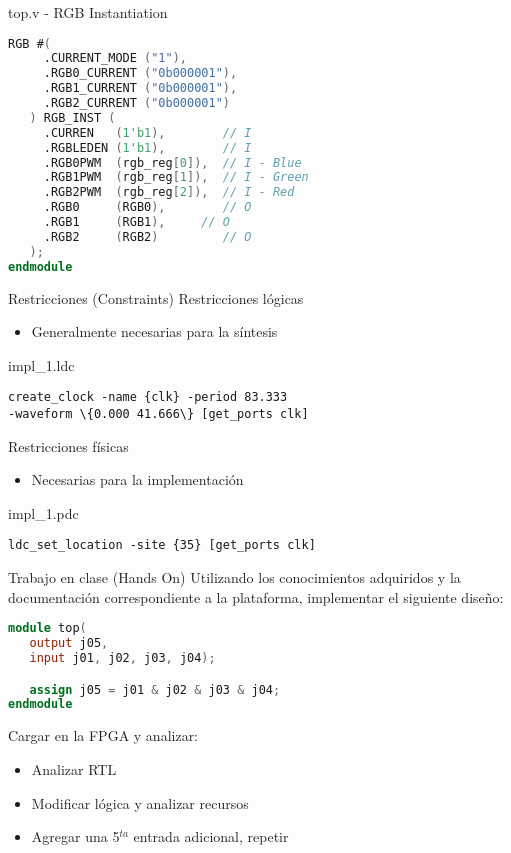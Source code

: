 \documentclass{beamer}
\begin{document}
\begin{frame}[fragile]{top.v - RGB Instantiation}
\begin{lstlisting}[language=Verilog]
   RGB #(
     .CURRENT_MODE ("1"),
     .RGB0_CURRENT ("0b000001"),
     .RGB1_CURRENT ("0b000001"),
     .RGB2_CURRENT ("0b000001")
   ) RGB_INST (
     .CURREN   (1'b1),        // I
     .RGBLEDEN (1'b1),        // I
     .RGB0PWM  (rgb_reg[0]),  // I - Blue
     .RGB1PWM  (rgb_reg[1]),  // I - Green
     .RGB2PWM  (rgb_reg[2]),  // I - Red
     .RGB0     (RGB0),        // O
     .RGB1     (RGB1),	   // O
     .RGB2     (RGB2)         // O
   );
endmodule
\end{lstlisting}
\end{frame}

\begin{frame}[fragile]{Restricciones (Constraints)}
Restricciones lógicas
\begin{itemize}
	\item Generalmente necesarias para la síntesis
\end{itemize}
\begin{block}{impl\_1.ldc}
\begin{lstlisting}
create_clock -name {clk} -period 83.333 
-waveform \{0.000 41.666\} [get_ports clk]
\end{lstlisting}
\end{block}
\vfill
Restricciones físicas
\begin{itemize}
	\item Necesarias para la implementación
\end{itemize}
\begin{block}{impl\_1.pdc}
\begin{lstlisting}
ldc_set_location -site {35} [get_ports clk]
\end{lstlisting}
\end{block}
\end{frame}

\begin{frame}[fragile]{Trabajo en clase (Hands On)}
Utilizando los conocimientos adquiridos y la documentación correspondiente a la plataforma, implementar el siguiente diseño:
\begin{lstlisting}[language=Verilog]
module top(
   output j05,
   input j01, j02, j03, j04);

   assign j05 = j01 & j02 & j03 & j04;
endmodule
\end{lstlisting}
Cargar en la FPGA y analizar:
\begin{itemize}
	\item Analizar RTL
	\item Modificar lógica y analizar recursos
	\item Agregar una 5$^{ta}$ entrada adicional, repetir
\end{itemize}
\end{frame}
\end{document}
